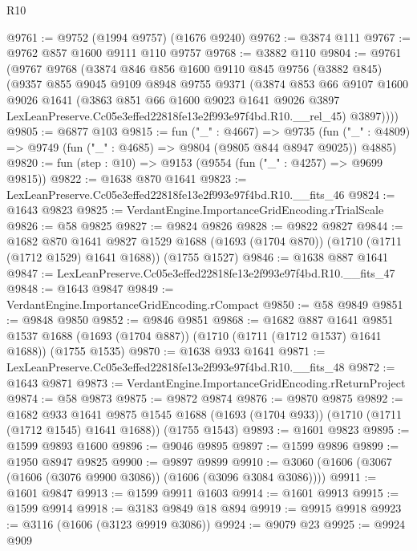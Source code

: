 \begin{lexlean}{R10}
\begin{coremodule}
@9761 := @9752 (@1994 @9757) (@1676 @9240)
@9762 := @3874 @111
@9767 := @9762 @857 @1600 @9111 @110 @9757
@9768 := @3882 @110
@9804 := @9761
    (@9767
      @9768
      (@3874
        @846
        @856
        @1600
        @9110
        @845
        @9756
        (@3882 @845)
        (@9357
          @855
          @9045
          @9109
          @8948
          @9755
          @9371
          (@3874
            @853
            @66
            @9107
            @1600
            @9026
            @1641
            (@3863
              @851
              @66
              @1600
              @9023
              @1641
              @9026
              @3897
              LexLeanPreserve.Cc05e3effed22818fe13e2f993e97f4bd.R10.__rel_45)
            @3897))))
@9805 := @6877 @103
@9815 := fun ("_" : @4667) =>
  @9735 (fun ("_" : @4809) => @9749 (fun ("_" : @4685) => @9804 (@9805 @844 @8947 @9025)) @4885)
@9820 := fun (step : @10) => @9153 (@9554 (fun ("_" : @4257) => @9699 @9815))
@9822 := @1638 @870 @1641
@9823 := LexLeanPreserve.Cc05e3effed22818fe13e2f993e97f4bd.R10.__fits_46
@9824 := @1643 @9823
@9825 := VerdantEngine.ImportanceGridEncoding.rTrialScale
@9826 := @58 @9825
@9827 := @9824 @9826
@9828 := @9822 @9827
@9844 := @1682
    @870
    @1641
    @9827
    @1529
    @1688
    (@1693 (@1704 @870))
    (@1710 (@1711 (@1712 @1529) @1641 @1688))
    (@1755 @1527)
@9846 := @1638 @887 @1641
@9847 := LexLeanPreserve.Cc05e3effed22818fe13e2f993e97f4bd.R10.__fits_47
@9848 := @1643 @9847
@9849 := VerdantEngine.ImportanceGridEncoding.rCompact
@9850 := @58 @9849
@9851 := @9848 @9850
@9852 := @9846 @9851
@9868 := @1682
    @887
    @1641
    @9851
    @1537
    @1688
    (@1693 (@1704 @887))
    (@1710 (@1711 (@1712 @1537) @1641 @1688))
    (@1755 @1535)
@9870 := @1638 @933 @1641
@9871 := LexLeanPreserve.Cc05e3effed22818fe13e2f993e97f4bd.R10.__fits_48
@9872 := @1643 @9871
@9873 := VerdantEngine.ImportanceGridEncoding.rReturnProject
@9874 := @58 @9873
@9875 := @9872 @9874
@9876 := @9870 @9875
@9892 := @1682
    @933
    @1641
    @9875
    @1545
    @1688
    (@1693 (@1704 @933))
    (@1710 (@1711 (@1712 @1545) @1641 @1688))
    (@1755 @1543)
@9893 := @1601 @9823
@9895 := @1599 @9893 @1600
@9896 := @9046 @9895
@9897 := @1599 @9896
@9899 := @1950 @8947 @9825
@9900 := @9897 @9899
@9910 := @3060 (@1606 (@3067 (@1606 (@3076 @9900 @3086)) (@1606 (@3096 @3084 @3086))))
@9911 := @1601 @9847
@9913 := @1599 @9911 @1603
@9914 := @1601 @9913
@9915 := @1599 @9914
@9918 := @3183 @9849 @18 @894
@9919 := @9915 @9918
@9923 := @3116 (@1606 (@3123 @9919 @3086))
@9924 := @9079 @23
@9925 := @9924 @909

\end{coremodule}
\end{lexlean}
